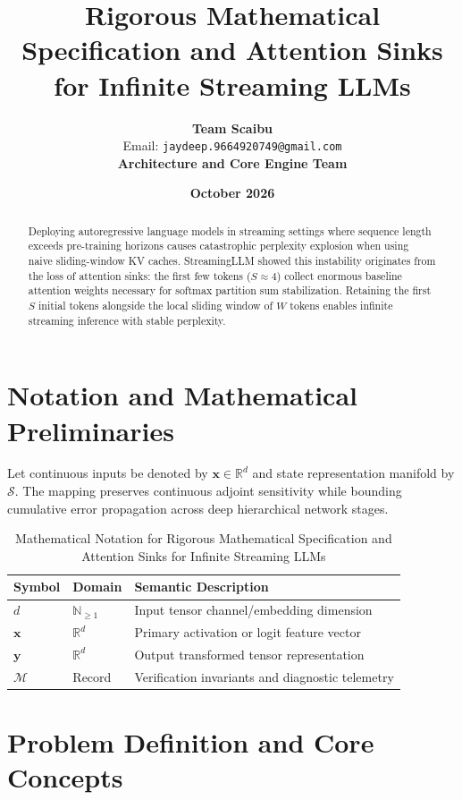 \documentclass[11pt,a4paper]{article}
\title{\textbf{Rigorous Mathematical Specification and Attention Sinks for Infinite Streaming LLMs}}
\author{\textbf{Team Scaibu} \\ \small Email: \texttt{jaydeep.9664920749@gmail.com} \\ \small \textbf{Architecture and Core Engine Team}}
\date{\textbf{October 2026}}
\theoremstyle{definition}
\begin{document}
\maketitle

\begin{abstract}
Deploying autoregressive language models in streaming settings where sequence length exceeds pre-training horizons causes catastrophic perplexity explosion when using naive sliding-window KV caches. StreamingLLM showed this instability originates from the loss of attention sinks: the first few tokens ($S \approx 4$) collect enormous baseline attention weights necessary for softmax partition sum stabilization. Retaining the first $S$ initial tokens alongside the local sliding window of $W$ tokens enables infinite streaming inference with stable perplexity.
\end{abstract}

\section{Notation and Mathematical Preliminaries}

Let continuous inputs be denoted by $\mathbf{x} \in \mathbb{R}^d$ and state representation manifold by $\mathcal{S}$. The mapping preserves continuous adjoint sensitivity while bounding cumulative error propagation across deep hierarchical network stages.

\begin{table}[h]
\centering
\caption{Mathematical Notation for Rigorous Mathematical Specification and Attention Sinks for Infinite Streaming LLMs}
\begin{tabular}{lll}
\toprule
\textbf{Symbol} & \textbf{Domain} & \textbf{Semantic Description} \\
\midrule
$d$ & $\mathbb{N}_{\ge 1}$ & Input tensor channel/embedding dimension \\
$\mathbf{x}$ & $\mathbb{R}^d$ & Primary activation or logit feature vector \\
$\mathbf{y}$ & $\mathbb{R}^d$ & Output transformed tensor representation \\
$\mathcal{M}$ & Record & Verification invariants and diagnostic telemetry \\
\bottomrule
\end{tabular}
\end{table}

\section{Problem Definition and Core Concepts}
\end{document}
